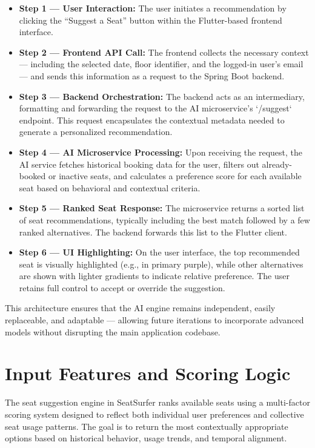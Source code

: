 \documentclass[12pt,a4paper]{report}
\begin{document}
\begin{itemize}
\item \textbf{Step 1 — User Interaction:}
The user initiates a recommendation by clicking the “Suggest a Seat” button within the Flutter-based frontend interface.
\item \textbf{Step 2 — Frontend API Call:}  
The frontend collects the necessary context — including the selected date, floor identifier, and the logged-in user's email — and sends this information as a request to the Spring Boot backend.
\item \textbf{Step 3 — Backend Orchestration:}  
The backend acts as an intermediary, formatting and forwarding the request to the AI microservice's `/suggest` endpoint. This request encapsulates the contextual metadata needed to generate a personalized recommendation.
\item \textbf{Step 4 — AI Microservice Processing:}  
Upon receiving the request, the AI service fetches historical booking data for the user, filters out already-booked or inactive seats, and calculates a preference score for each available seat based on behavioral and contextual criteria.
\item \textbf{Step 5 — Ranked Seat Response:}  
The microservice returns a sorted list of seat recommendations, typically including the best match followed by a few ranked alternatives. The backend forwards this list to the Flutter client.
\item \textbf{Step 6 — UI Highlighting:}  
On the user interface, the top recommended seat is visually highlighted (e.g., in primary purple), while other alternatives are shown with lighter gradients to indicate relative preference. The user retains full control to accept or override the suggestion.
\end{itemize}

This architecture ensures that the AI engine remains independent, easily replaceable, and adaptable — allowing future iterations to incorporate advanced models without disrupting the main application codebase.

\section{Input Features and Scoring Logic}

The seat suggestion engine in SeatSurfer ranks available seats using a multi-factor scoring system designed to reflect both individual user preferences and collective seat usage patterns. The goal is to return the most contextually appropriate options based on historical behavior, usage trends, and temporal alignment.
\end{document}
